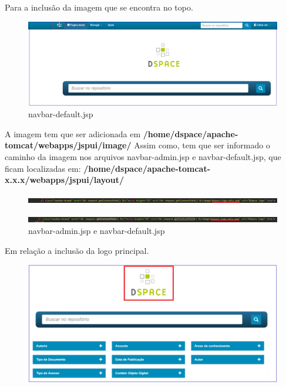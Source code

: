 \documentclass[12pt,hidelinks]{article}
\begin{document}
Para a inclusão da imagem que se encontra no topo.

\begin{figure}[!htp]
        \centering
        \includegraphics[scale=0.5]{figura/logo-topo.png}
        \caption{navbar-default.jsp}
        \label{Rotulo}
    \end{figure}
    
A imagem tem que ser adicionada em \textbf{/home/dspace/apache-tomcat/webapps/jspui/image/}  
\singlespacing
Assim como, tem que ser informado o caminho da imagem nos arquivos navbar-admin.jsp e navbar-default.jsp, que ficam localizadas em: \textbf{/home/dspace/apache-tomcat-x.x.x/webapps/jspui/layout/}  

\begin{figure}[!htp]
        \centering
        \includegraphics[scale=0.3]{figura/dspace-logo-only1.png}
        \label{Rotulo}
    \end{figure}
    
\begin{figure}[!htp]
        \centering
        \includegraphics[scale=0.3]{figura/dspace-logo-only2.png}
        \caption{navbar-admin.jsp e navbar-default.jsp}
        \label{Rotulo}
    \end{figure}

Em relação a inclusão da logo principal.
\begin{figure}[!htp]
        \centering
        \includegraphics[scale=0.5]{figura/logo-principal.png}
        \caption{}
        \label{Rotulo}
    \end{figure}
    
\end{document}
